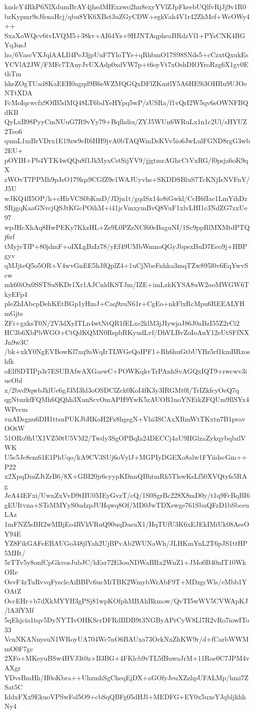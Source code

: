 kndcY4RkP6NlXdumBrAY4jhsdMIExzwo2hn8exyYVlZJpFkeebUQlfvRjJj9v1R0
bzKypmr9sJfenaHcj/qbu8YK6XBst3uZGyCDW+egkVah4V1r42ZhMef+WcOWy4++
SxaXoWQcv6tvLVQM5+38kv+AI64Yz+9HJNTAqpheaBRdzVf1+PYsCNK4BGYq3usJ
ho/6VascVXJqlAALIl4PeJ3jpUuF7YloTYe+qRhbmO17S98SNds5+cCzxtQxukEs
YCVlA2JW/FMFc7TAnyJvUXAdp0xdVW7p+t6oyVt7xOshDIOYroRzg6X1gv0EthTm
hkeZOgTUad8KaEEH0agqd9B6eWZMQGQxDFlZKmtlY5A6HE9i3OHRu9UJOeNTtXDA
FcMoIqcwcfx9OfB5dMQ48LT6bdYeHYpq5wP/zUSRa/f1vQrI2W5qv6sOWNFBQdKB
QyLxB98PyyCmNUuG7R9vYy79+Bqfhdiu/ZYJ5WUn6WRuLx1n1c2Ul/sHYUZ2Teo6
qumL1mBrVDrx1E19zw9eR6HH9jvA0bTAQWmDsKVv5io6JwLulFGND8rgG3wb2EU+
pOYIH+Pb4YTK4wQQu8f1JkMyxCstSijYV9/jjgtmrAGhcCtVxRG/f0psja6oK9qX
zWOvT7PPMh9pJsO179lqz9CGfZ9e1WAJUyvhs+SKDDSBluS7TcKNjIsNVFnY/J5U
wJKQ4fI5OP/h+cHlrVCS0bKmD/JDju1t/gqdSx14o8iGwkl/CcH6fIac1LmYihDz
SRjgqKaaGNvcjQSJtKGcPOihM+i41jcVmxymBvQ8VuF1xlvLHI1c3NdZG7zxUe97
wpJHcXhAq8HwPEKy7KkzHL+Ze9L0PZzNCf60eBaguNI/1Sc9ppRlMXMtdPTQj6rf
tMyjvTfP+80jdmF+oIXLgBzIz78/yEf49UMbWmnoQGyJbpsxBuD7Eeo9j+HBPgyv
qMJjteQ5o5OR+V4wvGnEE5hJfQplZ4+1uCjNbeFnhka3mqTZw895l0v6EqYwvScw
mk60iOx0SSTSuSKDr1Xr1AJCnldKSTJm/IZE+imLzkKYSA8uW2ooMWGW6TkyEFp4
pleZhIAbcpDehKEtBGp1yHmJ+Caq9zuN61r+CgEo+nkFlxRcMpu6REEALYHmGjts
ZFi+gxksT0N/2V3dXyITLn4wtNtQR1fELxe2klM3jJIywjoJ86J0aBzI55Z2rCi2
HC3b6XbPbWGO+CtQdKQMN0RspbRKyudLvf/DhVLBvZoIoAuY12eUtSFfNXJn9w3C
/bk+xkY0NgEVBowKl7xq9aWqIrTLWGeQoIPF1+Rh6huGtbUYBz5rf1kmBRzoshfk
oElfSDTIPp3r7ESUBAfwAXGaswC+POWKqkvTrPAnhSvAGQxIQT9+rwcwv3iueObl
x/2bvd9qwbJklUe6gJ3M3ld3oOSDClZck0KoI4fK3y3IRGMt0l/TrIZkfcyOeQ7q
qgNtuzkfFQMh6QQhh3XunScvOmAPH9YwK5zAUOR1noYNEikZFQUm9IlSYx4WPecm
vnADsgnu6DH1ttsnPUKJbHKoH2Fz8hgsgN+Vhi3SCAxXRmWtTKxtn7B1pvavOOtW
51ORo9hUX1VZ50tU5VM2/Twdy3SgOPBqIa24DECCj4aU9IIGlzaZykqybqbzlVWK
U5c5Je8em61E1PhUqo/kA9CV3SUj6oVylJ+MGPIyDGEXo8alw1FYiidscGm++P22
x2XpqDiuZJtZrB6/8X+GBI20jr6cyypKDnnQBhtmRk5TlswKsLf50XVQtyfs5RAg
JeA44EFxi/UwnZxVvD9tIIU0MEyGvzT/cQ/1S0SgrBc228X8mD0y/t1q9FcBqBI6
gEUItvna+STsMMYyS0udzpJUHqwq8Of/MD0JwTDXswge761SbuQFzD1bSbceuLAz
1mFNZ5sBR2wMBjEo4RVkVRuQ90uqDasuX1/HqTUfU3K6xEJEkIMiUk08AesOY94E
YZ8FikGAFeEBAUGo348jlYah2UjBPvAb2WUNaWh/JLHKmYnL2T6pJS1ttHP5MHt/
5rTTv5y8onfCpGkvosJubJC/hEsr72E3ouNDWaBRx2WnZ1+JMo0B40nIT10WkORe
OsvF4zTuRvvqFyscleAiBBPc6ucMiTBK2WmybWrAbF9T+MDzgcWls/eMbb1YOAtZ
OccEHr+b7dXkMYYH3gPSj81wpKOfphMBAhBkmow/QvTI5wWV5CVWApKJ/lA3fYMf
5qEhjcia1tqv5DyNYTIvOHKScrDFRdBDB9t3NGByAPrCyW8Ll7R2vRo7iowITo33
VcnNKANnysuN1WRoyUA704Wc7nO6BAUxa73OckNxZhKW9r/d+fCarbWWMmO0F7gc
2XFo+MKeyuBSw4HVJ3t0z+B3BG+4FKlcb9vTL5fBuwaJrM+11Roe0C7JPM4vAXgr
YDvsBmHh/H0oKbra++UhzmhSgCheqEjDX+aGOfyJeuXZzhpUFALMp/hmi7ZSat5C
IddxFXx9EkuoVPSwFol5O9+cbSqQBFg05dHJl+MEDFG+EY0x5uxsYJqbljkhhNy4
